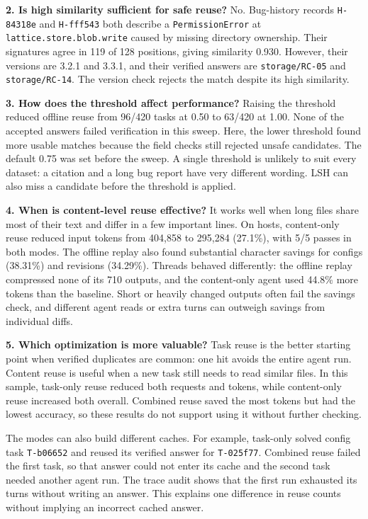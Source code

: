 \documentclass[10pt]{article}
\begin{document}
\textbf{2. Is high similarity sufficient for safe reuse?}
No. Bug-history records \texttt{H-84318e} and \texttt{H-fff543} both describe
a \texttt{PermissionError} at \nolinkurl{lattice.store.blob.write} caused by
missing directory ownership. Their signatures agree in 119 of 128 positions,
giving similarity 0.930. However, their versions are 3.2.1 and 3.3.1, and their
verified answers are \texttt{storage/RC-05} and \texttt{storage/RC-14}.
The version check rejects the match despite its high similarity.

\textbf{3. How does the threshold affect performance?}
Raising the threshold reduced offline reuse from 96/420 tasks at 0.50 to
63/420 at 1.00. None of the accepted answers failed verification in this sweep.
Here, the lower threshold found more usable matches because the field checks
still rejected unsafe candidates. The default 0.75 was set before the sweep.
A single threshold is unlikely to suit every dataset: a citation and a long
bug report have very different wording. LSH can also miss a candidate before
the threshold is applied.

\textbf{4. When is content-level reuse effective?}
It works well when long files share most of their text and differ in a few
important lines. On hosts, content-only reuse reduced input tokens from
404,858 to 295,284 (27.1\%), with 5/5 passes in both modes. The offline replay
also found substantial character savings for configs (38.31\%) and revisions
(34.29\%). Threads behaved differently: the offline replay compressed none of
its 710 outputs, and the content-only agent used 44.8\% more tokens than the
baseline. Short or heavily changed outputs often fail the savings check, and
different agent reads or extra turns can outweigh savings from individual diffs.

\textbf{5. Which optimization is more valuable?}
Task reuse is the better starting point when verified duplicates are common:
one hit avoids the entire agent run. Content reuse is useful when a new task
still needs to read similar files. In this sample, task-only reuse reduced both
requests and tokens, while content-only reuse increased both overall. Combined
reuse saved the most tokens but had the lowest accuracy, so these results do
not support using it without further checking.

The modes can also build different caches. For example, task-only solved config
task \texttt{T-b06652} and reused its verified answer for \texttt{T-025f77}.
Combined reuse failed the first task, so that answer could not enter its cache
and the second task needed another agent run. The trace audit shows that the
first run exhausted its turns without writing an answer. This explains one
difference in reuse counts without implying an incorrect cached answer.
\end{document}
